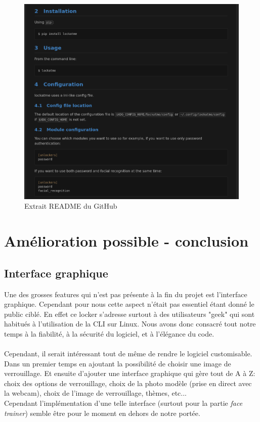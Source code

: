 \documentclass[french]{report}
\begin{document}
\begin{figure}[h]\label{fig:readme}
  \includegraphics[width=\linewidth]{readme}
  \caption{Extrait README du GitHub}
  \label{fig:readme}
\end{figure}


\chapter{Amélioration possible - conclusion}

\newpage

\section{Interface graphique}
Une des grosses features qui n'est pas présente à la fin du projet est l'interface
graphique. Cependant pour nous cette aspect n'était pas essentiel étant donné le public ciblé.
En effet ce locker s'adresse surtout à des utilisateurs "geek" qui sont habitués à
l'utilisation de la CLI sur Linux. Nous avons donc consacré tout notre temps à
la fiabilité, à la sécurité du logiciel, et à l'élégance du code.\\\\
Cependant, il serait intéressant tout de même de rendre le logiciel customisable.
Dans un premier temps en ajoutant la possibilité de choisir une image de verrouillage.
Et ensuite d'ajouter une interface graphique qui gère tout de A à Z: choix des options
de verrouillage, choix de la photo modèle (prise en direct avec la webcam), choix de
l'image de verrouillage, thèmes, etc...\\
Cependant l'implémentation d'une telle interface (surtout pour la partie \emph{face trainer})
semble être pour le moment en dehors de notre portée.
\end{document}
